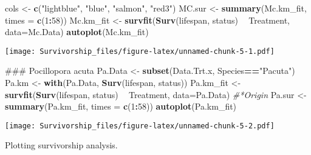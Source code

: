 \documentclass[]{article}
\newenvironment{Shaded}{\begin{snugshade}}{\end{snugshade}}
\newcommand{\KeywordTok}[1]{\textcolor[rgb]{0.13,0.29,0.53}{\textbf{#1}}}
\newcommand{\DataTypeTok}[1]{\textcolor[rgb]{0.13,0.29,0.53}{#1}}
\newcommand{\DecValTok}[1]{\textcolor[rgb]{0.00,0.00,0.81}{#1}}
\newcommand{\StringTok}[1]{\textcolor[rgb]{0.31,0.60,0.02}{#1}}
\newcommand{\CommentTok}[1]{\textcolor[rgb]{0.56,0.35,0.01}{\textit{#1}}}
\newcommand{\OperatorTok}[1]{\textcolor[rgb]{0.81,0.36,0.00}{\textbf{#1}}}
\newcommand{\NormalTok}[1]{#1}
\begin{document}
\begin{Shaded}
\begin{Highlighting}[]
\NormalTok{cols <-}\StringTok{ }\KeywordTok{c}\NormalTok{(}\StringTok{"lightblue"}\NormalTok{, }\StringTok{"blue"}\NormalTok{, }\StringTok{"salmon"}\NormalTok{, }\StringTok{"red3"}\NormalTok{)}
\NormalTok{MC.sur <-}\StringTok{ }\KeywordTok{summary}\NormalTok{(Mc.km_fit, }\DataTypeTok{times =} \KeywordTok{c}\NormalTok{(}\DecValTok{1}\OperatorTok{:}\DecValTok{58}\NormalTok{))}
\NormalTok{Mc.km_fit <-}\StringTok{ }\KeywordTok{survfit}\NormalTok{(}\KeywordTok{Surv}\NormalTok{(lifespan, status) }\OperatorTok{~}\StringTok{ }\NormalTok{Treatment, }\DataTypeTok{data=}\NormalTok{Mc.Data)}
\KeywordTok{autoplot}\NormalTok{(Mc.km_fit)}
\end{Highlighting}
\end{Shaded}

\texttt{[image: Survivorship\_files/figure-latex/unnamed-chunk-5-1.pdf]}

\begin{Shaded}
\begin{Highlighting}[]
\NormalTok{### Pocillopora acuta}
\NormalTok{Pa.Data <-}\StringTok{ }\KeywordTok{subset}\NormalTok{(Data.Trt.x, Species}\OperatorTok{==}\StringTok{"Pacuta"}\NormalTok{)}
\NormalTok{Pa.km <-}\StringTok{ }\KeywordTok{with}\NormalTok{(Pa.Data, }\KeywordTok{Surv}\NormalTok{(lifespan, status))}
\NormalTok{Pa.km_fit <-}\StringTok{ }\KeywordTok{survfit}\NormalTok{(}\KeywordTok{Surv}\NormalTok{(lifespan, status) }\OperatorTok{~}\StringTok{ }\NormalTok{Treatment, }\DataTypeTok{data=}\NormalTok{Pa.Data) }\CommentTok{#*Origin}
\NormalTok{Pa.sur <-}\StringTok{ }\KeywordTok{summary}\NormalTok{(Pa.km_fit, }\DataTypeTok{times =} \KeywordTok{c}\NormalTok{(}\DecValTok{1}\OperatorTok{:}\DecValTok{58}\NormalTok{))}
\KeywordTok{autoplot}\NormalTok{(Pa.km_fit)}
\end{Highlighting}
\end{Shaded}

\texttt{[image: Survivorship\_files/figure-latex/unnamed-chunk-5-2.pdf]}

Plotting survivorship analysis.
\end{document}
